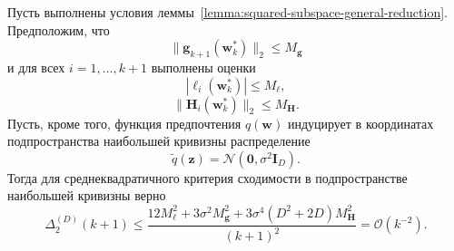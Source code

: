 \begin{theorem}
    \label{thm:squared-subspace-general}
    Пусть выполнены условия леммы~\ref{lemma:squared-subspace-general-reduction}. Предположим, что
    \begin{equation}
        \|\mathbf g_{k+1}(\mathbf w_k^*)\|_2 \leqslant M_{\mathbf g}
    \end{equation}
    и для всех $i=1, \ldots, k+1$ выполнены оценки
    \begin{equation}
        |\ell_i(\mathbf w_k^*)| \leqslant M_\ell,
    \end{equation}
    \begin{equation}
        \|\mathbf H_i(\mathbf w_k^*)\|_2 \leqslant M_{\mathbf H}.
    \end{equation}
    Пусть, кроме того, функция предпочтения $q(\mathbf w)$ индуцирует в координатах подпространства наибольшей кривизны распределение
    \begin{equation}
        \tilde q(\mathbf z)=\mathcal N(\mathbf 0, \sigma^2 \mathbf I_D).
    \end{equation}
    Тогда для среднеквадратичного критерия сходимости в подпространстве наибольшей кривизны верно
    \begin{equation}
        \label{eq:squared-subspace-general-theorem}
        \Delta_2^{(D)}(k+1)
        \leqslant
        \frac{
            12M_\ell^2
            +
            3\sigma^2 M_{\mathbf g}^2
            +
            3\sigma^4(D^2+2D)M_{\mathbf H}^2
        }{(k+1)^2}
        = \mathcal{O}(k^{-2}).
    \end{equation}
\end{theorem}

